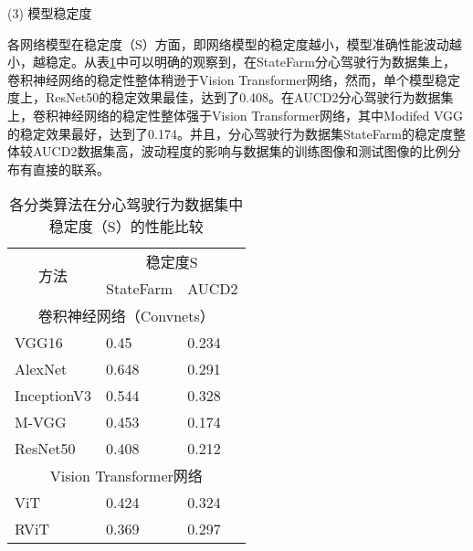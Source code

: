 (3)	模型稳定度

各网络模型在稳定度（S）方面，即网络模型的稳定度越小，模型准确性能波动越小，越稳定。从表\ref{表3.4}中可以明确的观察到，在StateFarm分心驾驶行为数据集上，卷积神经网络的稳定性整体稍逊于Vision Transformer网络，然而，单个模型稳定度上，ResNet50的稳定效果最佳，达到了0.408。在AUCD2分心驾驶行为数据集上，卷积神经网络的稳定性整体强于Vision Transformer网络，其中Modifed VGG的稳定效果最好，达到了0.174。并且，分心驾驶行为数据集StateFarm的稳定度整体较AUCD2数据集高，波动程度的影响与数据集的训练图像和测试图像的比例分布有直接的联系。


\begin{table}[!ht]
	\caption{各分类算法在分心驾驶行为数据集中稳定度（S）的性能比较}
	\label{表3.4}
	\renewcommand{\arraystretch}{1.5}
	\centering
	\begin{tabular}{p{3.75cm}<{\centering}p{3.75cm}<{\centering}p{3.75cm}<{\centering}}
		\bottomrule
		\multicolumn{1}{c}{\multirow{2}{*}{方法}} & \multicolumn{2}{c}{稳定度S}                                  \\ \cline{2-3} 
		\multicolumn{1}{c}{}                    & \multicolumn{1}{c}{StateFarm} & \multicolumn{1}{c}{AUCD2} \\ 
		\midrule
		\multicolumn{3}{c}{卷积神经网络（Convnets）}                                                                \\
		\midrule
		VGG16                                   & 0.45                          & 0.234                     \\
		AlexNet                                 & 0.648                         & 0.291                     \\
		InceptionV3                             & 0.544                         & 0.328                     \\
		M-VGG                                   & 0.453                         & 0.174                     \\
		ResNet50                                & 0.408                         & 0.212                     \\ \midrule
		\multicolumn{3}{c}{Vision Transformer网络}                                                          \\ \midrule
		ViT                                     & 0.424                         & 0.324                     \\
		RViT                                    & 0.369                         & 0.297                     \\
		\bottomrule
	\end{tabular}
\end{table}


